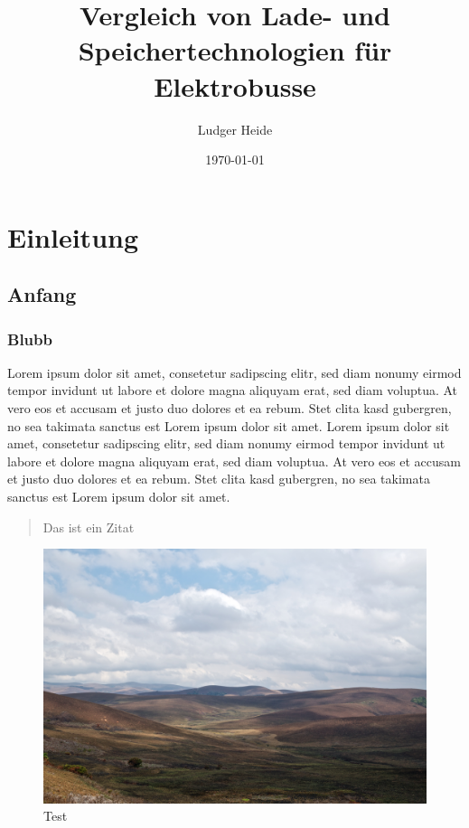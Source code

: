 \documentclass[twoside]{scrreprt}
\begin{document}
\title{Vergleich von Lade- und Speichertechnologien für Elektrobusse}
\author{Ludger Heide}
\date{\today}
\maketitle

\tableofcontents


\chapter{Einleitung}
\section{Anfang}
\subsection{Blubb}
Lorem ipsum dolor sit amet, consetetur sadipscing elitr, sed diam nonumy eirmod tempor invidunt ut labore et dolore magna aliquyam erat, sed diam voluptua. At vero eos et accusam et justo duo dolores et ea rebum. Stet clita kasd gubergren, no sea takimata sanctus est Lorem ipsum dolor sit amet. Lorem ipsum dolor sit amet, consetetur sadipscing elitr, sed diam nonumy eirmod tempor invidunt ut labore et dolore magna aliquyam erat, sed diam voluptua. At vero eos et accusam et justo duo dolores et ea rebum. Stet clita kasd gubergren, no sea takimata sanctus est Lorem ipsum dolor sit amet.
\begin{quote}
	Das ist ein Zitat \cite{Association:2005}
\end{quote}

\begin{figure}[htbp]
  \includegraphics[width=\textwidth]{Abbildungen/Nyika.jpg}
  \caption{Test}
\end{figure}
\end{document}
